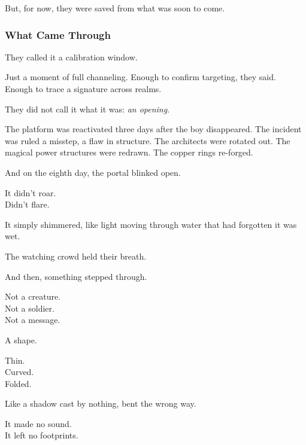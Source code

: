 \documentclass[12pt]{article}
\begin{document}
But, for now, they were saved from what was soon to come.

\dotfill

\subsubsection*{What Came Through}

They called it a calibration window.

\vspace{0.5em}
Just a moment of full channeling. Enough to confirm targeting, they said. Enough to trace a signature across realms.

\vspace{0.5em}
They did not call it what it was: \textit{an opening}.

\vspace{0.5em}
The platform was reactivated three days after the boy disappeared. The incident was ruled a misstep, a flaw in structure. The architects were rotated out. The magical power structures were redrawn. The copper rings re-forged.

\vspace{0.5em}
And on the eighth day, the portal blinked open.

\vspace{0.5em}
It didn’t roar.\\
Didn’t flare.

\vspace{0.5em}
It simply shimmered, like light moving through water that had forgotten it was wet.

\vspace{0.5em}
The watching crowd held their breath.

\vspace{0.5em}
And then, something stepped through.

\vspace{0.5em}
Not a creature.\\
Not a soldier.\\
Not a message.

\vspace{0.5em}
A shape.

\vspace{0.5em}
Thin.\\
Curved.\\
Folded.

\vspace{0.5em}
Like a shadow cast by nothing, bent the wrong way.

\vspace{0.5em}
It made no sound.\\
It left no footprints.
\end{document}
